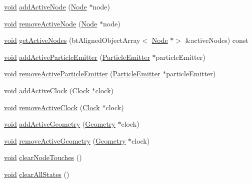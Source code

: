 \begin{DoxyCompactItemize}
\mbox{\hyperlink{_thread_8h_af1e856da2e658414cb2456cb6f7ebc66}{void}} \mbox{\hyperlink{classnjli_1_1_scene_af1b996e40edb70d8eff9b3aef11f9197}{add\+Active\+Node}} (\mbox{\hyperlink{classnjli_1_1_node}{Node}} $\ast$node)
\item 
\mbox{\hyperlink{_thread_8h_af1e856da2e658414cb2456cb6f7ebc66}{void}} \mbox{\hyperlink{classnjli_1_1_scene_a5a826df53ef02ccb6bdcd7969c186162}{remove\+Active\+Node}} (\mbox{\hyperlink{classnjli_1_1_node}{Node}} $\ast$node)
\item 
\mbox{\hyperlink{_thread_8h_af1e856da2e658414cb2456cb6f7ebc66}{void}} \mbox{\hyperlink{classnjli_1_1_scene_aafc49de895ac5cdf65bdd2668b186333}{get\+Active\+Nodes}} (bt\+Aligned\+Object\+Array$<$ \mbox{\hyperlink{classnjli_1_1_node}{Node}} $\ast$$>$ \&active\+Nodes) const
\item 
\mbox{\hyperlink{_thread_8h_af1e856da2e658414cb2456cb6f7ebc66}{void}} \mbox{\hyperlink{classnjli_1_1_scene_ac4345dcab380f4f28240047f684100a8}{add\+Active\+Particle\+Emitter}} (\mbox{\hyperlink{classnjli_1_1_particle_emitter}{Particle\+Emitter}} $\ast$particle\+Emitter)
\item 
\mbox{\hyperlink{_thread_8h_af1e856da2e658414cb2456cb6f7ebc66}{void}} \mbox{\hyperlink{classnjli_1_1_scene_a09172111155b23406c7110982fbce2bc}{remove\+Active\+Particle\+Emitter}} (\mbox{\hyperlink{classnjli_1_1_particle_emitter}{Particle\+Emitter}} $\ast$particle\+Emitter)
\item 
\mbox{\hyperlink{_thread_8h_af1e856da2e658414cb2456cb6f7ebc66}{void}} \mbox{\hyperlink{classnjli_1_1_scene_a8ccfdf570bddfeda002ab780f14223a0}{add\+Active\+Clock}} (\mbox{\hyperlink{classnjli_1_1_clock}{Clock}} $\ast$clock)
\item 
\mbox{\hyperlink{_thread_8h_af1e856da2e658414cb2456cb6f7ebc66}{void}} \mbox{\hyperlink{classnjli_1_1_scene_a31e1f83511a7340324c21cb1285ed0a2}{remove\+Active\+Clock}} (\mbox{\hyperlink{classnjli_1_1_clock}{Clock}} $\ast$clock)
\item 
\mbox{\hyperlink{_thread_8h_af1e856da2e658414cb2456cb6f7ebc66}{void}} \mbox{\hyperlink{classnjli_1_1_scene_aadb34e2132fede8f4a3dc0a9fdbb9d2c}{add\+Active\+Geometry}} (\mbox{\hyperlink{classnjli_1_1_geometry}{Geometry}} $\ast$clock)
\item 
\mbox{\hyperlink{_thread_8h_af1e856da2e658414cb2456cb6f7ebc66}{void}} \mbox{\hyperlink{classnjli_1_1_scene_af4f7c3b7b136bbf4f8aad6640814b9a3}{remove\+Active\+Geometry}} (\mbox{\hyperlink{classnjli_1_1_geometry}{Geometry}} $\ast$clock)
\item 
\mbox{\hyperlink{_thread_8h_af1e856da2e658414cb2456cb6f7ebc66}{void}} \mbox{\hyperlink{classnjli_1_1_scene_ad8f34eff6d8d4fff8c293936b316f4b9}{clear\+Node\+Touches}} ()
\item 
\mbox{\hyperlink{_thread_8h_af1e856da2e658414cb2456cb6f7ebc66}{void}} \mbox{\hyperlink{classnjli_1_1_scene_a7a3b03d4a7537c7716f88ba8e10af13a}{clear\+All\+States}} ()
\end{DoxyCompactItemize}
